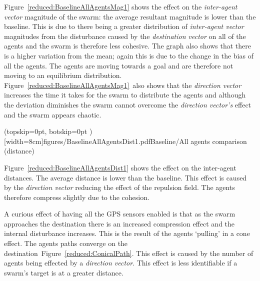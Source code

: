 \documentclass{ieeeaccess}
\begin{document}
Figure~\ref{reduced:BaselineAllAgentsMag1} shows the effect on the \textit{inter-agent vector} magnitude of the swarm: the average resultant magnitude is lower than the baseline. This is due to there being a greater distribution of \textit{inter-agent vector} magnitudes from the disturbance caused by the \textit{destination vector} on all of the agents and the swarm is therefore less cohesive. The graph also shows that there is a higher variation from the mean; again this is due to the change in the bias of all the agents. The agents are moving towards a goal and are therefore not moving to an equilibrium distribution. Figure~\ref{reduced:BaselineAllAgentsMag1}~also shows that the \textit{direction vector} increases the time it takes for the swarm to distribute the agents and although the deviation diminishes the swarm cannot overcome the \textit{direction vector's} effect and the swarm appears chaotic.

\Figure[t!](topskip=0pt, botskip=0pt )[width=8cm]{figures/BaselineAllAgentsDist1.pdf}{Baseline/All agents comparison (distance)\label{reduced:BaselineAllAgentsDist1}}

Figure~\ref{reduced:BaselineAllAgentsDist1} shows the effect on the inter-agent distances. The average distance is lower than the baseline. This effect is caused by the \textit{direction vector} reducing the effect of the repulsion field. The agents therefore compress slightly due to the cohesion.

A curious effect of having all the GPS sensors enabled is that as the swarm approaches the destination there is an increased compression effect and the internal disturbance increases. This is the result of the agents `pulling' in a cone effect. The agents paths converge on the destination~Figure~\ref{reduced:ConicalPath}. This effect is caused by the number of agents being effected by a \textit{direction vector}. This effect is less identifiable if a swarm's target is at a greater distance.  

\end{document}
